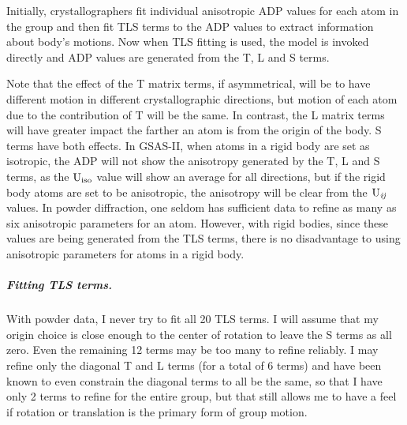 Initially, crystallographers fit individual anisotropic ADP values for each atom in the group and then fit TLS terms to the ADP values to extract information about body's motions. Now when TLS fitting is used, the model is invoked directly and ADP values are generated from the T, L and S terms. 

Note that the effect of the T matrix terms, if asymmetrical, will be to have different motion in different crystallographic directions, but motion of each atom due to the contribution of T will be the same. In contrast, the L matrix terms will have greater impact the farther an atom is from the origin of the body. S terms have both effects. In GSAS-II, when atoms in a rigid body are set as isotropic, the ADP will not show the anisotropy generated by the T, L and S terms, as the $\rm U_{iso}$ value will show an average for all directions, but if the rigid body atoms are set to be anisotropic, the anisotropy will be clear from the $\rm U_{\it ij}$ values. In powder diffraction, one seldom has sufficient data to refine as many as six anisotropic parameters for an atom. However, with rigid bodies, since these values are being generated from the TLS terms, there is no disadvantage to using anisotropic parameters for atoms in a rigid body. 

\subparagraph{Fitting TLS terms.} With powder data, I never try to fit all 20 TLS terms. I will assume that my origin choice is close enough to the center of rotation to leave the S terms as all zero. Even the remaining 12 terms may be too many to refine reliably. I may refine only the diagonal T and L terms (for a total of 6 terms) and have been known to even constrain the diagonal terms to all be the same, so that I have only 2 terms to refine for the entire group, but that still allows me to have a feel if rotation or translation is the primary form of group motion. 